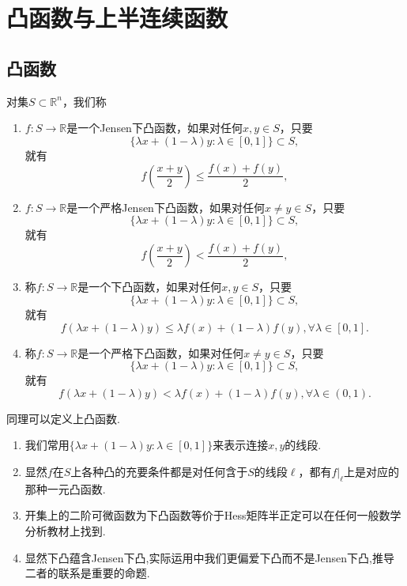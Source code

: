\documentclass[../../main.tex]{subfiles}
\begin{document}
\section{凸函数与上半连续函数}

\subsection{凸函数}

\begin{definition}[下凸函数的定义]\label{definition:下凸函数的定义}
对集\(S\subset\mathbb{R}^n\)，我们称
\begin{enumerate}
\item \(f:S\to\mathbb{R}\)是一个Jensen下凸函数，如果对任何\(x,y\in S\)，只要
\[\{\lambda x+(1 - \lambda)y:\lambda\in[0,1]\}\subset S,\]
就有
\[f\left(\frac{x + y}{2}\right)\leqslant\frac{f(x)+f(y)}{2},\]

\item \(f:S\to\mathbb{R}\)是一个严格Jensen下凸函数，如果对任何\(x\neq y\in S\)，只要
\[\{\lambda x+(1 - \lambda)y:\lambda\in[0,1]\}\subset S,\]
就有
\[f\left(\frac{x + y}{2}\right)<\frac{f(x)+f(y)}{2},\]

\item 称\(f:S\to\mathbb{R}\)是一个下凸函数，如果对任何\(x,y\in S\)，只要
\[\{\lambda x+(1 - \lambda)y:\lambda\in[0,1]\}\subset S,\]
就有
\[f(\lambda x+(1 - \lambda)y)\leqslant\lambda f(x)+(1 - \lambda)f(y),\forall\lambda\in[0,1].\]

\item 称\(f:S\to\mathbb{R}\)是一个严格下凸函数，如果对任何\(x\neq y\in S\)，只要
\[\{\lambda x+(1 - \lambda)y:\lambda\in[0,1]\}\subset S,\]
就有
\[f(\lambda x+(1 - \lambda)y)<\lambda f(x)+(1 - \lambda)f(y),\forall\lambda\in(0,1).\]
\end{enumerate}
\end{definition}
\begin{remark}
同理可以定义上凸函数.
\end{remark}
\begin{note}
\begin{enumerate}
\item 我们常用\(\{\lambda x+(1 - \lambda)y:\lambda\in[0,1]\}\)来表示连接\(x,y\)的线段.

\item 显然\(f\)在\(S\)上各种凸的充要条件都是对任何含于\(S\)的线段\(\ell\)，都有\(f|_{\ell}\)上是对应的那种一元凸函数.

\item 开集上的二阶可微函数为下凸函数等价于Hess矩阵半正定可以在任何一般数学分析教材上找到. 

\item 显然下凸蕴含Jensen下凸,实际运用中我们更偏爱下凸而不是Jensen下凸,推导二者的联系是重要的命题. 
\end{enumerate}
\end{note}
\end{document}
